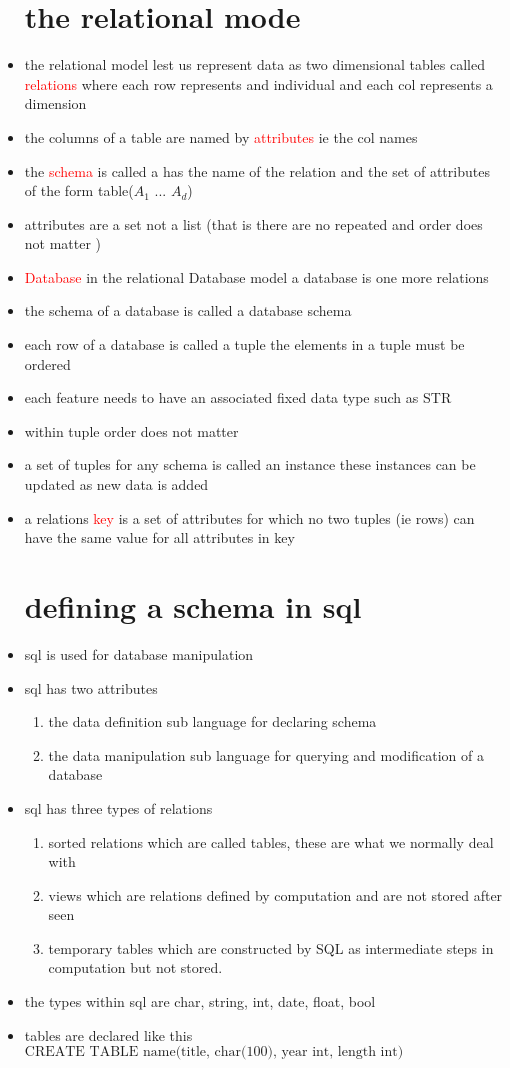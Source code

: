 \documentclass{article}
\begin{document}
\begin{itemize}
\section*{the relational mode }
\item the relational model lest us represent data as two dimensional tables called \textcolor{red}{relations} where each row represents and individual and each col represents a dimension
\item the columns of a table are named by  \textcolor{red}{attributes} ie the col names
\item the \textcolor{red}{schema} is called a has the name of the relation and the set of attributes of the form table($A_1$ ... $A_d$)
\item attributes are a set not a list (that is there are no repeated and order does not matter )
\item \textcolor{red}{Database} in the relational Database model a database is one more relations
\item the schema of a database is called a database schema 
\item each row of a database is called a tuple the elements in a tuple must be ordered
\item each feature needs to have an associated fixed data type such as STR 
\item within tuple order does not matter 
\item a set of tuples for any schema is called an instance these instances can be updated as new data is added 
\item a relations \textcolor{red}{key} is a set of attributes for which no two tuples (ie rows) can have the same value for all attributes in key 
\section*{defining a schema in sql }
\item sql is used for database manipulation 
\item sql has two attributes 
\begin{enumerate}
    \item the data definition sub language for declaring schema 
    \item the data manipulation sub language for querying and  modification of a database 
\end{enumerate}
\item sql has three types of relations 
\begin{enumerate}
    \item sorted relations which are called tables, these are what we normally deal with 
    \item views which are relations defined by computation and are not stored after seen 
    \item temporary tables which are constructed by SQL as intermediate steps in computation but not stored. 
\end{enumerate}
\item  the types within sql are char, string, int, date, float, bool
\item tables are declared like this $\text{CREATE TABLE name(title, char(100), year int, length int)} $

\end{itemize}
\end{document}
